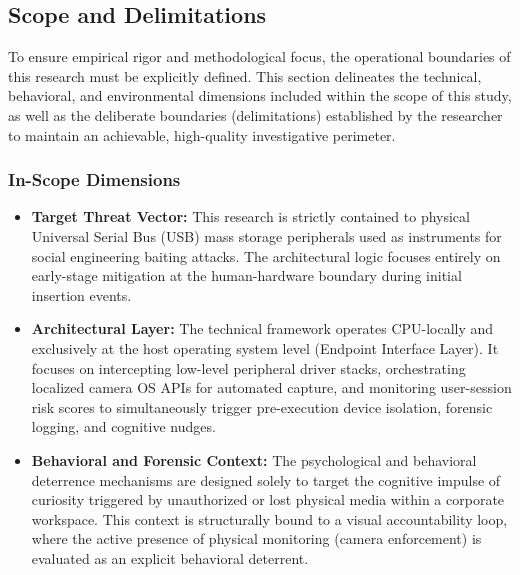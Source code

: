 \documentclass{ieeeaccess}
\begin{document}
\subsection{Scope and Delimitations}
To ensure empirical rigor and methodological focus, the operational boundaries of this research must be explicitly defined. This section delineates the technical, behavioral, and environmental dimensions included within the scope of this study, as well as the deliberate boundaries (delimitations) established by the researcher to maintain an achievable, high-quality investigative perimeter.

\subsubsection{In-Scope Dimensions}
\begin{itemize}
    \item \textbf{Target Threat Vector:} This research is strictly contained to physical Universal Serial Bus (USB) mass storage peripherals used as instruments for social engineering baiting attacks. The architectural logic focuses entirely on early-stage mitigation at the human-hardware boundary during initial insertion events.
    \item \textbf{Architectural Layer:} The technical framework operates CPU-locally and exclusively at the host operating system level (Endpoint Interface Layer). It focuses on intercepting low-level peripheral driver stacks, orchestrating localized camera OS APIs for automated capture, and monitoring user-session risk scores to simultaneously trigger pre-execution device isolation, forensic logging, and cognitive nudges.
    \item \textbf{Behavioral and Forensic Context:} The psychological and behavioral deterrence mechanisms are designed solely to target the cognitive impulse of curiosity triggered by unauthorized or lost physical media within a corporate workspace. This context is structurally bound to a visual accountability loop, where the active presence of physical monitoring (camera enforcement) is evaluated as an explicit behavioral deterrent.
\end{itemize}
\end{document}
